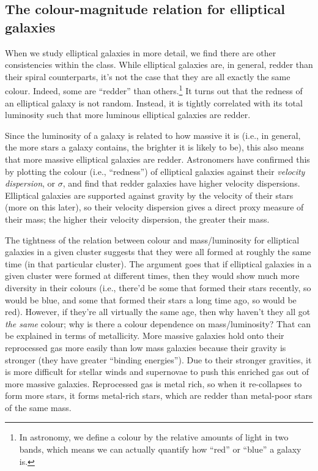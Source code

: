 \documentclass[11pt]{article}
\begin{document}
\subsection{The colour-magnitude relation for elliptical galaxies}
When we study elliptical galaxies in more detail, we find there are
other consistencies within the class. While elliptical galaxies are,
in general, redder than their spiral counterparts, it's not the case
that they are all exactly the same colour. Indeed, some are ``redder''
than others.\footnote{In astronomy, we define a colour by the relative
  amounts of light in two bands, which means we can actually quantify
  how ``red'' or ``blue'' a galaxy is.} It turns out that the redness
of an elliptical galaxy is not random.  Instead, it is tightly
correlated with its total luminosity such that more luminous
elliptical galaxies are redder. 

Since the luminosity of a galaxy is related to how massive it is
(i.e., in general, the more stars a galaxy contains, the brighter it
is likely to be), this also means that more massive elliptical
galaxies are redder. Astronomers have confirmed this by plotting the
colour (i.e., ``redness'') of elliptical galaxies against their {\it
  velocity dispersion}, or $\sigma$, and find that redder galaxies
have higher velocity dispersions. Elliptical galaxies are supported
against gravity by the velocity of their stars (more on this later),
so their velocity dispersion gives a direct proxy measure of their
mass; the higher their velocity dispersion, the greater their mass.

The tightness of the relation between colour and mass/luminosity for
elliptical galaxies in a given cluster suggests that they were all
formed at roughly the same time (in that particular cluster). The
argument goes that if elliptical galaxies in a given cluster were
formed at different times, then they would show much more diversity in
their colours (i.e., there'd be some that formed their stars recently,
so would be blue, and some that formed their stars a long time ago, so
would be red). However, if they're all virtually the same age, then
why haven't they all got {\it the same} colour; why is there a colour
dependence on mass/luminosity?  That can be explained in terms of
metallicity. More massive galaxies hold onto their reprocessed gas
more easily than low mass galaxies because their gravity is stronger
(they have greater ``binding energies''). Due to their stronger
gravities, it is more difficult for stellar winds and supernovae to
push this enriched gas out of more massive galaxies. Reprocessed gas is metal
rich, so when it re-collapses to form more stars, it forms metal-rich
stars, which are redder than metal-poor stars of the same mass.
\end{document}

